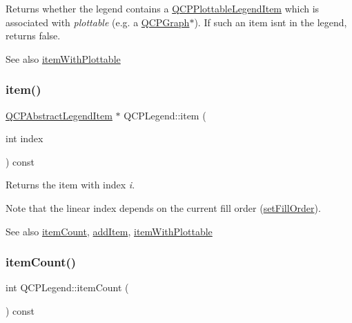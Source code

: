 Returns whether the legend contains a \hyperlink{class_q_c_p_plottable_legend_item}{Q\+C\+P\+Plottable\+Legend\+Item} which is associated with {\itshape plottable} (e.\+g. a \hyperlink{class_q_c_p_graph}{Q\+C\+P\+Graph}$\ast$). If such an item isn\textquotesingle{}t in the legend, returns false.

\begin{DoxySeeAlso}{See also}
\hyperlink{class_q_c_p_legend_a91e790002d8bf15a20628a8e8841e397}{item\+With\+Plottable} 
\end{DoxySeeAlso}
\mbox{\label{class_q_c_p_legend_acfe9694c45104a3359d3806ed366fcf7}} 
\subsubsection{\texorpdfstring{item()}{item()}}
{\footnotesize\ttfamily \hyperlink{class_q_c_p_abstract_legend_item}{Q\+C\+P\+Abstract\+Legend\+Item} $\ast$ Q\+C\+P\+Legend\+::item (\begin{DoxyParamCaption}\item[{int}]{index }\end{DoxyParamCaption}) const}

Returns the item with index {\itshape i}.

Note that the linear index depends on the current fill order (\hyperlink{class_q_c_p_layout_grid_affc2f3cfd22f28698c5b29b960d2a391}{set\+Fill\+Order}).

\begin{DoxySeeAlso}{See also}
\hyperlink{class_q_c_p_legend_a57ab86ab8b2a3762d4c1455eb5452c88}{item\+Count}, \hyperlink{class_q_c_p_legend_a3ab274de52d2951faea45a6d975e6b3f}{add\+Item}, \hyperlink{class_q_c_p_legend_a91e790002d8bf15a20628a8e8841e397}{item\+With\+Plottable} 
\end{DoxySeeAlso}
\mbox{\label{class_q_c_p_legend_a57ab86ab8b2a3762d4c1455eb5452c88}} 
\subsubsection{\texorpdfstring{item\+Count()}{itemCount()}}
{\footnotesize\ttfamily int Q\+C\+P\+Legend\+::item\+Count (\begin{DoxyParamCaption}{ }\end{DoxyParamCaption}) const}

